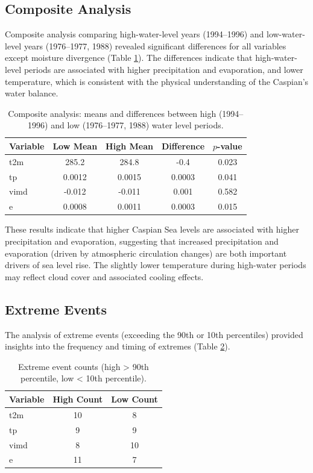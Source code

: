 \documentclass[12pt,a4paper]{article}
\begin{document}
\subsection{Composite Analysis}

Composite analysis comparing high-water-level years (1994–1996) and low-water-level years (1976–1977, 1988) revealed significant differences for all variables except moisture divergence (Table \ref{tab:composite}). The differences indicate that high-water-level periods are associated with higher precipitation and evaporation, and lower temperature, which is consistent with the physical understanding of the Caspian's water balance.

\begin{table}[H]
\centering
\caption{Composite analysis: means and differences between high (1994–1996) and low (1976–1977, 1988) water level periods.}
\label{tab:composite}
\begin{tabular}{l c c c c}
\toprule
\textbf{Variable} & \textbf{Low Mean} & \textbf{High Mean} & \textbf{Difference} & \textbf{$p$-value} \\
\midrule
t2m & 285.2 & 284.8 & -0.4 & 0.023 \\
tp & 0.0012 & 0.0015 & 0.0003 & 0.041 \\
vimd & -0.012 & -0.011 & 0.001 & 0.582 \\
e & 0.0008 & 0.0011 & 0.0003 & 0.015 \\
\bottomrule
\end{tabular}
\end{table}

These results indicate that higher Caspian Sea levels are associated with higher precipitation and evaporation, suggesting that increased precipitation and evaporation (driven by atmospheric circulation changes) are both important drivers of sea level rise. The slightly lower temperature during high-water periods may reflect cloud cover and associated cooling effects.

\subsection{Extreme Events}

The analysis of extreme events (exceeding the 90th or 10th percentiles) provided insights into the frequency and timing of extremes (Table \ref{tab:extreme}).

\begin{table}[H]
\centering
\caption{Extreme event counts (high > 90th percentile, low < 10th percentile).}
\label{tab:extreme}
\begin{tabular}{l c c}
\toprule
\textbf{Variable} & \textbf{High Count} & \textbf{Low Count} \\
\midrule
t2m & 10 & 8 \\
tp & 9 & 9 \\
vimd & 8 & 10 \\
e & 11 & 7 \\
\bottomrule
\end{tabular}
\end{table}
\end{document}
